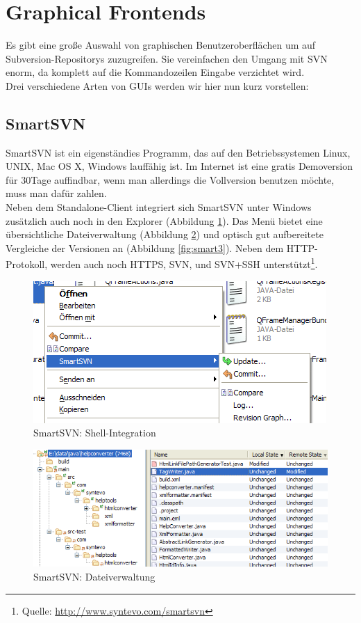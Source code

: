 \section{Graphical Frontends}
Es gibt eine große Auswahl von graphischen Benutzeroberflächen um auf Subversion-Repositorys zuzugreifen. Sie vereinfachen den Umgang mit SVN enorm, da komplett auf die Kommandozeilen Eingabe verzichtet wird.\\
Drei verschiedene Arten von GUIs werden wir hier nun kurz  vorstellen:
\subsection{SmartSVN}
SmartSVN ist ein eigenständies Programm, das auf den Betriebssystemen Linux, UNIX, Mac OS X, Windows lauffähig ist. Im Internet ist eine gratis Demoversion für 30Tage auffindbar, wenn man allerdings die Vollversion benutzen möchte, muss man dafür zahlen.\\
Neben dem Standalone-Client integriert sich SmartSVN unter Windows zusätzlich auch noch in den Explorer (Abbildung \ref{fig:smart1}). Das Menü bietet eine übersichtliche Dateiverwaltung (Abbildung \ref{fig:smart2}) und optisch gut aufbereitete Vergleiche der Versionen an (Abbildung \ref{fig:smart3}).
Neben dem HTTP-Protokoll, werden auch noch HTTPS, SVN, und SVN+SSH unterstützt\footnote{Quelle: \url{http://www.syntevo.com/smartsvn}}.
\begin{figure}[!htb]
        \centering
        \includegraphics[width=.8\textwidth]{1_smartsvn1.png}
        \caption{SmartSVN: Shell-Integration}
        \label{fig:smart1}
\end{figure}
\begin{figure}[!htb]
        \centering
        \includegraphics[width=.9\textwidth]{2_smartsvn2.png}
        \caption{SmartSVN: Dateiverwaltung}
        \label{fig:smart2}
\end{figure}
